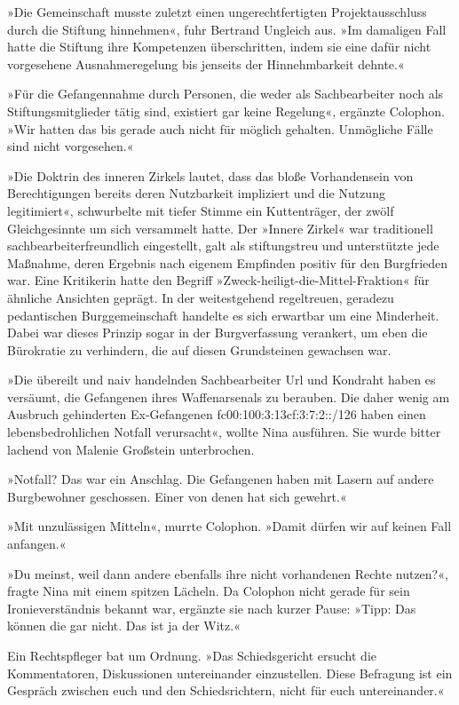 »Die Gemeinschaft musste zuletzt einen ungerechtfertigten Projektausschluss durch die Stiftung hinnehmen«, fuhr Bertrand Ungleich aus. »Im damaligen Fall hatte die Stiftung ihre Kompetenzen überschritten, indem sie eine dafür nicht vorgesehene Ausnahmeregelung bis jenseits der Hinnehmbarkeit dehnte.«

»Für die Gefangennahme durch Personen, die weder als Sachbearbeiter noch als Stiftungsmitglieder tätig sind, existiert gar keine Regelung«, ergänzte Colophon. »Wir hatten das bis gerade auch nicht für möglich gehalten. Unmögliche Fälle sind nicht vorgesehen.«

»Die Doktrin des inneren Zirkels lautet, dass das bloße Vorhandensein von Berechtigungen bereits deren Nutzbarkeit impliziert und die Nutzung legitimiert«, schwurbelte mit tiefer Stimme ein Kuttenträger, der zwölf Gleichgesinnte um sich versammelt hatte. Der »Innere Zirkel« war traditionell sachbearbeiterfreundlich eingestellt, galt als stiftungstreu und unterstützte jede Maßnahme, deren Ergebnis nach eigenem Empfinden positiv für den Burgfrieden war. Eine Kritikerin hatte den Begriff »Zweck-heiligt-die-Mittel-Fraktion« für ähnliche Ansichten geprägt. In der weitestgehend regeltreuen, geradezu pedantischen Burggemeinschaft handelte es sich erwartbar um eine Minderheit. Dabei war dieses Prinzip sogar in der Burgverfassung verankert, um eben die Bürokratie zu verhindern, die auf diesen Grundsteinen gewachsen war.

»Die übereilt und naiv handelnden Sachbearbeiter Url und Kondraht haben es versäumt, die Gefangenen ihres Waffenarsenals zu berauben. Die daher wenig am Ausbruch gehinderten Ex-Gefangenen fc00:100:3:13cf:3:7:2::/126 haben einen lebensbedrohlichen Notfall verursacht«, wollte Nina ausführen. Sie wurde bitter lachend von Malenie Großstein unterbrochen.

»Notfall? Das war ein Anschlag. Die Gefangenen haben mit Lasern auf andere Burgbewohner geschossen. Einer von denen hat sich gewehrt.«

»Mit unzulässigen Mitteln«, murrte Colophon. »Damit dürfen wir auf keinen Fall anfangen.«

»Du meinst, weil dann andere ebenfalls ihre nicht vorhandenen Rechte nutzen?«, fragte Nina mit einem spitzen Lächeln. Da Colophon nicht gerade für sein Ironieverständnis bekannt war, ergänzte sie nach kurzer Pause: »Tipp: Das können die gar nicht. Das ist ja der Witz.«

Ein Rechtspfleger bat um Ordnung. »Das Schiedsgericht ersucht die Kommentatoren, Diskussionen untereinander einzustellen. Diese Befragung ist ein Gespräch zwischen euch und den Schiedsrichtern, nicht für euch untereinander.«

